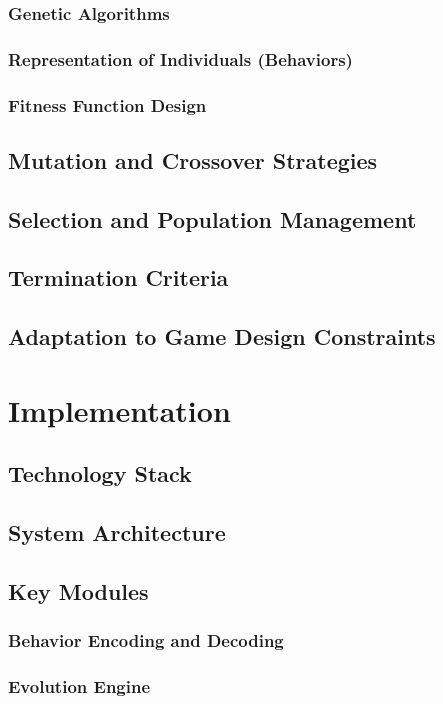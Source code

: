 \documentclass[12pt, twoside, openany]{book}
\begin{document}
	\subsection{Genetic Algorithms}
	\subsection{Representation of Individuals (Behaviors)}
	\subsection{Fitness Function Design}
	\section{Mutation and Crossover Strategies}
	\section{Selection and Population Management}
	\section{Termination Criteria}
	\section{Adaptation to Game Design Constraints}
	
	\chapter{Implementation}
	\section{Technology Stack}
	\section{System Architecture}
	\section{Key Modules}
	\subsection{Behavior Encoding and Decoding}
	\subsection{Evolution Engine}
\end{document}
